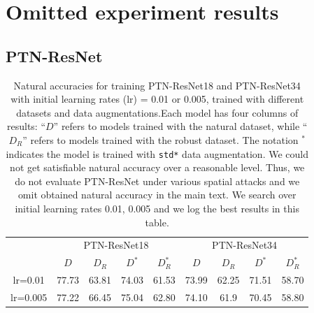 

\section{Omitted experiment results}
\subsection{PTN-ResNet}
\begin{table}[htb]
    \caption{Natural accuracies for training PTN-ResNet18 and PTN-ResNet34 with initial learning rates (lr) = 0.01 or 0.005, trained with different datasets and data augmentations.Each model has four columns of results: ``$D$'' refers to models trained with the natural dataset, while ``$D_R$'' refers to models trained with the robust dataset. The notation $^*$ indicates the model is trained with \texttt{std*} data augmentation. We could not get satisfiable natural accuracy over a reasonable level. Thus, we do not evaluate PTN-ResNet under various spatial attacks and we omit obtained natural accuracy in the main text. We search over initial learning rates {0.01, 0.005} and we log the best results in this table.} \label{tab:ptnresults}
    \begin{adjustwidth}{-.5in}{-.5in}  
        \vspace{15pt}
        \begin{center}
            \begin{tabular}{|c|cccc|cccc|}
                \hline
                  & \multicolumn{4}{c|}{PTN-ResNet18} & \multicolumn{4}{c|}{PTN-ResNet34} \\
         & $D$   & $D_R$        & $D^*$ & $D_R^*$ & $D$          & $D_R$ & $D^*$ & $D_R^*$ \\
         \hline
lr=0.01  & 77.73 & 63.81        & 74.03 & 61.53   & 73.99        & 62.25 & 71.51 & 58.70   \\
lr=0.005 & 77.22 & 66.45        & 75.04 & 62.80   & 74.10        & 61.9  & 70.45 & 58.80  \\
                \hline
            \end{tabular}
        \end{center}
    \end{adjustwidth}
\end{table}

